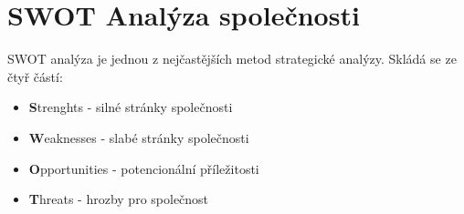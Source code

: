 \documentclass{article}
\begin{document}
\clearpage


\section*{SWOT Analýza společnosti}

SWOT analýza je jednou z nejčastějších metod strategické analýzy.
Skládá se ze čtyř částí:
\begin{itemize}
    \item \textbf{S}trenghts - silné stránky společnosti
    \item \textbf{W}eaknesses - slabé stránky společnosti
    \item \textbf{O}pportunities - potencionální příležitosti
    \item \textbf{T}hreats - hrozby pro společnost
\end{itemize}
\end{document}
